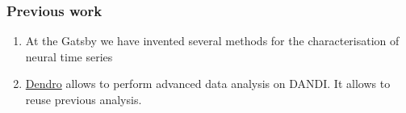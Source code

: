 \begin{frame}
    \frametitle{Previous work}

    \begin{enumerate}

		\item At the Gatsby we have invented several methods for the
		characterisation of neural time
		series~\citep[e.g.,][]{yuEtAl09,dunckerAndSahani18,ruttenEtAl20,yuEtAl24,buesingEtAl12a,buesingEtAl12b,mackeEtAl15,soulatEtAl21,walkerEtAl23,turnerAndSahani14,osheaEtAl22,pachitariuEtAl13a,pachitariuEtAl13b}

		\item \href{https://github.com/magland/dendro}{Dendro} allows to
		perform advanced data analysis on DANDI. It allows to reuse previous
		analysis.

    \end{enumerate}

\end{frame}

